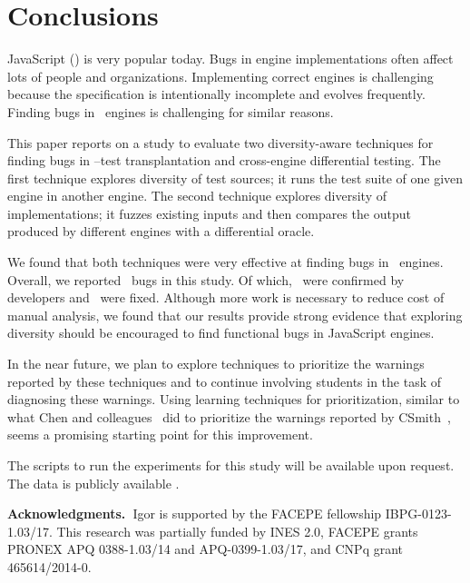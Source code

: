 \documentclass[smallextended]{svjour3}
\begin{document}
\section{Conclusions}


JavaScript (\js{}) is very popular today. Bugs in engine
implementations often affect lots of people and organizations.
Implementing correct engines is challenging because the specification
is intentionally incomplete and evolves frequently. Finding bugs in
\js\ engines is challenging for similar reasons.

This paper reports on a study to evaluate two diversity-aware
techniques for finding bugs in \js{}--test transplantation and
cross-engine differential testing. The first technique explores
diversity of test sources; it runs the test suite of one given engine
in another engine. The second technique explores diversity of
implementations; it fuzzes existing inputs and then compares the
output produced by different engines with a differential oracle.

We found that both techniques were very effective at finding bugs in
\js\ engines.  Overall, we reported \totalBugsReported\ bugs in this
study. Of which, \totalBugsConfirmed\ were confirmed by developers and
\totalBugsFixed\ were fixed. Although more work is necessary to reduce
cost of manual analysis, we found that our results provide strong
evidence that exploring diversity should be encouraged to find
functional bugs in JavaScript engines.

In the near future, we plan to explore techniques to prioritize the
warnings reported by these techniques and to continue involving
students in the task of diagnosing these warnings. Using learning
techniques for prioritization, similar to what Chen and
colleagues~\cite{Chen:2017:LPT:3097368.3097451} did to prioritize the
warnings reported by CSmith~\cite{Yang:2011:FUB:1993498.1993532},
seems a promising starting point for this improvement.

The scripts to run the experiments for this study will be available
upon request. The data is publicly available \dataRepo{}.

\vspace{1ex}
\sloppy
\noindent\textbf{Acknowledgments.~}Igor is supported by the FACEPE
fellowship IBPG-0123-1.03/17. This research was partially funded by
INES 2.0, FACEPE grants PRONEX APQ 0388-1.03/14 and APQ-0399-1.03/17,
and CNPq grant 465614/2014-0.

\balance
%


\end{document}
